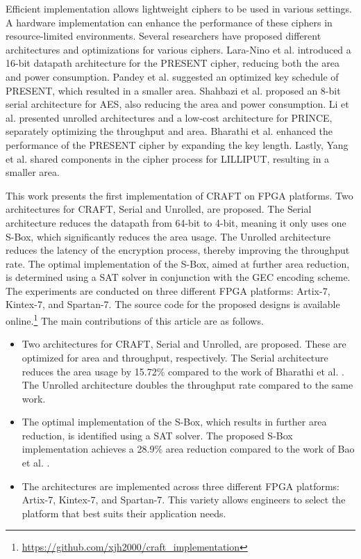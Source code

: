 \documentclass[final,5p,times,twocolumn]{elsarticle}
\begin{document}
Efficient implementation allows lightweight ciphers to be used in various settings.
A hardware implementation can enhance the performance of these ciphers in resource-limited environments.
Several researchers have proposed different architectures and optimizations for various ciphers.
Lara-Nino et al. \cite{LaraNino2017} introduced a 16-bit datapath architecture for the PRESENT cipher, reducing both the area and power consumption.
Pandey et al. \cite{Pandey2019} suggested an optimized key schedule of PRESENT, which resulted in a smaller area.
Shahbazi et al. \cite{Shahbazi2021} proposed an 8-bit serial architecture for AES, also reducing the area and power consumption.
Li et al. \cite{Li2021} presented unrolled architectures and a low-cost architecture for PRINCE, separately optimizing the throughput and area.
Bharathi et al. \cite{Bharathi2022} enhanced the performance of the PRESENT cipher by expanding the key length.
Lastly, Yang et al. \cite{Yang2023} shared components in the cipher process for LILLIPUT, resulting in a smaller area.


This work presents the first implementation of CRAFT on FPGA platforms.
Two architectures for CRAFT, Serial and Unrolled, are proposed. The Serial architecture reduces the datapath from 64-bit to 4-bit, meaning it only uses one S-Box, which significantly reduces the area usage.
The Unrolled architecture reduces the latency of the encryption process, thereby improving the throughput rate.
The optimal implementation of the S-Box, aimed at further area reduction, is determined using a SAT solver in conjunction with the GEC encoding scheme.
The experiments are conducted on three different FPGA platforms: Artix-7, Kintex-7, and Spartan-7.
The source code for the proposed designs is available online.\footnote{\url{https://github.com/xjh2000/craft_implementation}}
The main contributions of this article are as follows.
\begin{itemize}
    \item Two architectures for CRAFT, Serial and Unrolled, are proposed. These are optimized for area and throughput, respectively.
          The Serial architecture reduces the area usage by 15.72\% compared to the work of Bharathi et al. \cite{Bharathi2022}.
          The Unrolled architecture doubles the throughput rate compared to the same work.
    \item The optimal implementation of the S-Box, which results in further area reduction, is identified using a SAT solver.
          The proposed S-Box implementation achieves a 28.9\% area reduction compared to the work of Bao et al. \cite{bao2019peigen}.
    \item The architectures are implemented across three different FPGA platforms: Artix-7, Kintex-7, and Spartan-7. This variety allows engineers to select the platform that best suits their application needs.
\end{itemize}
\end{document}

